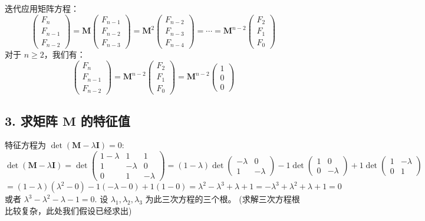 \documentclass{article}
\begin{document}
迭代应用矩阵方程：
$$ \begin{pmatrix} F_n \\ F_{n-1} \\ F_{n-2} \end{pmatrix} = \mathbf{M} \begin{pmatrix} F_{n-1} \\ F_{n-2} \\ F_{n-3} \end{pmatrix} = \mathbf{M}^2 \begin{pmatrix} F_{n-2} \\ F_{n-3} \\ F_{n-4} \end{pmatrix} = \cdots = \mathbf{M}^{n-2} \begin{pmatrix} F_2 \\ F_1 \\ F_0 \end{pmatrix} $$
对于 $n \ge 2$，我们有：
$$ \begin{pmatrix} F_n \\ F_{n-1} \\ F_{n-2} \end{pmatrix} = \mathbf{M}^{n-2} \begin{pmatrix} F_2 \\ F_1 \\ F_0 \end{pmatrix} = \mathbf{M}^{n-2} \begin{pmatrix} 1 \\ 0 \\ 0 \end{pmatrix} $$

\subsection*{3. 求矩阵 $\mathbf{M}$ 的特征值}

特征方程为 $\det(\mathbf{M} - \lambda \mathbf{I}) = 0$:
$$ \det(\mathbf{M} - \lambda \mathbf{I}) = \det \begin{pmatrix} 1-\lambda & 1 & 1 \\ 1 & -\lambda & 0 \\ 0 & 1 & -\lambda \end{pmatrix} = (1-\lambda) \det \begin{pmatrix} -\lambda & 0 \\ 1 & -\lambda \end{pmatrix} - 1 \det \begin{pmatrix} 1 & 0 \\ 0 & -\lambda \end{pmatrix} + 1 \det \begin{pmatrix} 1 & -\lambda \\ 0 & 1 \end{pmatrix} $$
$$ = (1-\lambda) (\lambda^2 - 0) - 1 (-\lambda - 0) + 1 (1 - 0) = \lambda^2 - \lambda^3 + \lambda + 1 = -\lambda^3 + \lambda^2 + \lambda + 1 = 0 $$
或者 $\lambda^3 - \lambda^2 - \lambda - 1 = 0$.
设 $\lambda_1, \lambda_2, \lambda_3$ 为此三次方程的三个根。 (求解三次方程根比较复杂，此处我们假设已经求出)
\end{document}

